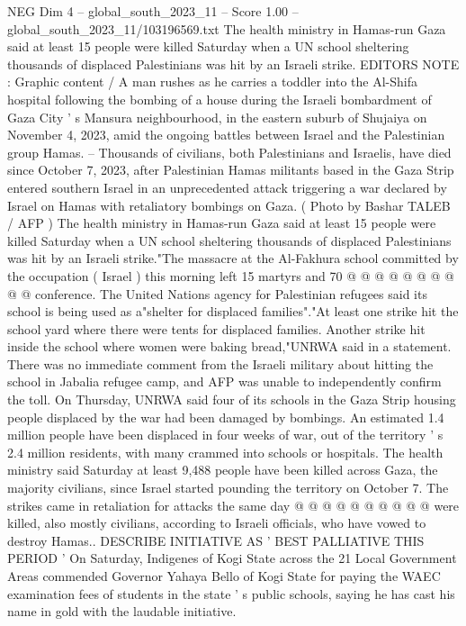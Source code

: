 \begin{textsample}{NEG Dim 4 – global\_south\_2023\_11 – Score 1.00 – global\_south\_2023\_11/103196569.txt}  \label{ex:f4_neg_300}
The health ministry in Hamas-run Gaza said at least 15 people were killed Saturday when a UN school sheltering thousands of displaced Palestinians was hit by an Israeli strike.
EDITORS NOTE : Graphic content / A man rushes as he carries a toddler into the Al-Shifa hospital following the bombing of a house during the Israeli bombardment of Gaza City ' s Mansura neighbourhood, in the eastern suburb of Shujaiya on November 4, 2023, amid the ongoing battles between Israel and the Palestinian group Hamas. -- Thousands of civilians, both Palestinians and Israelis, have died since October 7, 2023, after Palestinian Hamas militants based in the Gaza Strip entered southern Israel in an unprecedented attack triggering a war declared by Israel on Hamas with retaliatory bombings on Gaza. ( Photo by Bashar TALEB / AFP ) The health ministry in Hamas-run Gaza said at least 15 people were killed Saturday when a UN school sheltering thousands of displaced Palestinians was hit by an Israeli strike."The massacre at the Al-Fakhura school committed by the occupation ( Israel ) this morning left 15 martyrs and 70 @ @ @ @ @ @ @ @ @ @ conference.
The United Nations agency for Palestinian refugees said its school is being used as a"shelter for displaced families"."At least one strike hit the school yard where there were tents for displaced families.
Another strike hit inside the school where women were baking bread,"UNRWA said in a statement.
There was no immediate comment from the Israeli military about hitting the school in Jabalia refugee camp, and AFP was unable to independently confirm the toll.
On Thursday, UNRWA said four of its schools in the Gaza Strip housing people displaced by the war had been damaged by bombings.
An estimated 1.4 million people have been displaced in four weeks of war, out of the territory ' s 2.4 million residents, with many crammed into schools or hospitals.
The health ministry said Saturday at least 9,488 people have been killed across Gaza, the majority civilians, since Israel started pounding the territory on October 7.
The strikes came in retaliation for attacks the same day @ @ @ @ @ @ @ @ @ @ were killed, also mostly civilians, according to Israeli officials, who have vowed to destroy Hamas..
DESCRIBE INITIATIVE AS ' BEST PALLIATIVE THIS PERIOD ' On Saturday, Indigenes of Kogi State across the 21 Local Government Areas commended Governor Yahaya Bello of Kogi State for paying the WAEC examination fees of students in the state ' s public schools, saying he has cast his name in gold with the laudable initiative.

\end{textsample}
